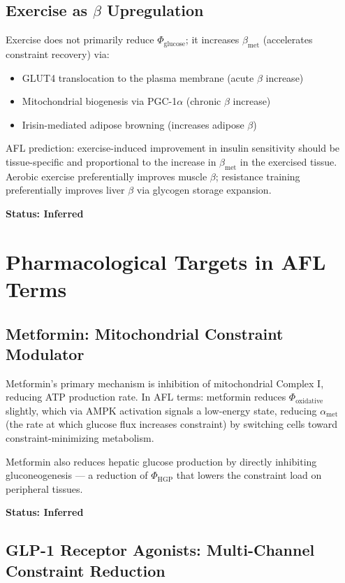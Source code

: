 \documentclass[11pt]{article}
\begin{document}
\subsection{Exercise as $\beta$ Upregulation}

Exercise does not primarily reduce $\Phi_{\mathrm{glucose}}$; it increases $\beta_{\mathrm{met}}$ (accelerates constraint recovery) via:
\begin{itemize}
    \item GLUT4 translocation to the plasma membrane (acute $\beta$ increase)
    \item Mitochondrial biogenesis via PGC-1$\alpha$ (chronic $\beta$ increase)
    \item Irisin-mediated adipose browning (increases adipose $\beta$)
\end{itemize}

AFL prediction: exercise-induced improvement in insulin sensitivity should be tissue-specific and proportional to the increase in $\beta_{\mathrm{met}}$ in the exercised tissue. Aerobic exercise preferentially improves muscle $\beta$; resistance training preferentially improves liver $\beta$ via glycogen storage expansion.

\textbf{Status: Inferred}

\section{Pharmacological Targets in AFL Terms}

\subsection{Metformin: Mitochondrial Constraint Modulator}

Metformin's primary mechanism is inhibition of mitochondrial Complex I, reducing ATP production rate. In AFL terms: metformin reduces $\Phi_{\mathrm{oxidative}}$ slightly, which via AMPK activation signals a low-energy state, reducing $\alpha_{\mathrm{met}}$ (the rate at which glucose flux increases constraint) by switching cells toward constraint-minimizing metabolism.

Metformin also reduces hepatic glucose production by directly inhibiting gluconeogenesis --- a reduction of $\Phi_{\mathrm{HGP}}$ that lowers the constraint load on peripheral tissues.

\textbf{Status: Inferred}

\subsection{GLP-1 Receptor Agonists: Multi-Channel Constraint Reduction}
\end{document}
